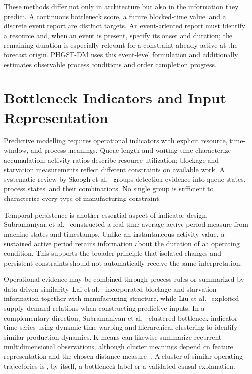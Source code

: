 These methods differ not only in architecture but also in the information they predict. A continuous bottleneck score, a future blocked-time value, and a discrete event report are distinct targets. An event-oriented report must identify a resource and, when an event is present, specify its onset and duration; the remaining duration is especially relevant for a constraint already active at the forecast origin. PHGST-DM uses this event-level formulation and additionally estimates observable process conditions and order completion progress.

\section{Bottleneck Indicators and Input Representation}\label{bottleneck-indicators-and-input-representation}

Predictive modelling requires operational indicators with explicit resource, time-window, and process meanings. Queue length and waiting time characterize accumulation; activity ratios describe resource utilization; blockage and starvation measurements reflect different constraints on available work. A systematic review by Skoogh et al.~\cite{subramaniyan2023throughput} groups detection evidence into queue states, process states, and their combinations. No single group is sufficient to characterize every type of manufacturing constraint.

Temporal persistence is another essential aspect of indicator design. Subramaniyan et al.~\cite{subramaniyan2016realtime} constructed a real-time average active-period measure from machine states and timestamps. Unlike an instantaneous activity value, a sustained active period retains information about the duration of an operating condition. This supports the broader principle that isolated changes and persistent constraints should not automatically receive the same interpretation.

Operational evidence may be combined through process rules or summarized by data-driven similarity. Lai et al.~\cite{lai2021data} incorporated blockage and starvation information together with manufacturing structure, while Liu et al.~\cite{liu2023lstmdam} exploited supply--demand relations when constructing predictive inputs. In a complementary direction, Subramaniyan et al.~\cite{subramaniyan2020clustering} clustered bottleneck-indicator time series using dynamic time warping and hierarchical clustering to identify similar production dynamics. K-means can likewise summarize recurrent multidimensional observations, although cluster meanings depend on feature representation and the chosen distance measure~\cite{jain2010clustering}. A cluster of similar operating trajectories is , by itself, a bottleneck label or a validated causal explanation.

